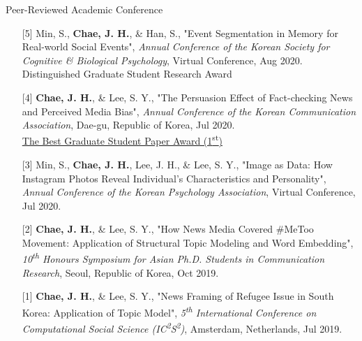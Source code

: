 \documentclass{resume} %
\begin{document}
\begin{rSection}{Peer-Reviewed Academic Conference}
\begin{flushleft}
\begin{itemize}
\setlength{\leftskip}{-0.32in}
\setlength{\itemindent}{-0.22in}
\item[] [5] Min, S., {\bf Chae, J. H.}, \& Han, S., "Event Segmentation in Memory for Real-world Social Events", {\em Annual Conference of the Korean Society for Cognitive \& Biological Psychology}, Virtual Conference, Aug 2020.
\vspace{0.02in}
\\ \textbullet{} Distinguished Graduate Student Research Award

\item[] [4] {\bf Chae, J. H.}, \& Lee, S. Y., "The Persuasion Effect of Fact-checking News and Perceived Media Bias", {\em Annual Conference of the Korean Communication Association}, Dae-gu, Republic of Korea, Jul 2020.
\vspace{0.02in}
\\ \textbullet{} \href{https://comm.or.kr/Forum/Main/ViewContents/c80588f5-9eb3-4991-b746-7d0bd86cfb7e?ThreadId=1000012302&Page=1&SearchKey=all&Keyword=%EC%9A%B0%EC%88%98%EB%85%BC%EB%AC%B8}{The Best Graduate Student Paper Award (1\textsuperscript{st})}

\item[] [3] Min, S., {\bf Chae, J. H.}, Lee, J. H., \& Lee, S. Y., "Image as Data: How Instagram Photos Reveal Individual’s Characteristics and Personality", {\em Annual Conference of the Korean Psychology Association}, Virtual Conference, Jul 2020.

\item[] [2] {\bf Chae, J. H.}, \& Lee, S. Y., "How News Media Covered \#MeToo Movement: Application of Structural Topic Modeling and Word Embedding", {\em 10\textsuperscript{th} Honours Symposium for Asian Ph.D. Students in Communication Research}, Seoul, Republic of Korea, Oct 2019.

\item[] [1] {\bf Chae, J. H.}, \& Lee, S. Y., "News Framing of Refugee Issue in South Korea: Application of Topic Model", {\em 5\textsuperscript{th} International Conference on Computational Social Science (IC\textsuperscript{2}S\textsuperscript{2})}, Amsterdam, Netherlands, Jul 2019.
\end{itemize}
\end{flushleft}
\end{rSection}
\end{document}
